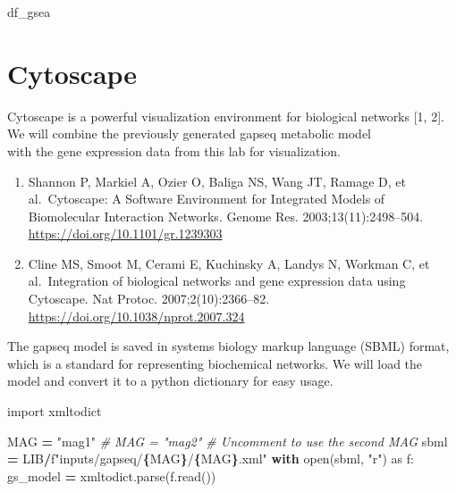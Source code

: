 \documentclass[
]{book}
\newenvironment{Shaded}{\begin{snugshade}}{\end{snugshade}}
\newcommand{\BuiltInTok}[1]{#1}
\newcommand{\CommentTok}[1]{\textcolor[rgb]{0.56,0.35,0.01}{\textit{#1}}}
\newcommand{\ControlFlowTok}[1]{\textcolor[rgb]{0.13,0.29,0.53}{\textbf{#1}}}
\newcommand{\ImportTok}[1]{#1}
\newcommand{\NormalTok}[1]{#1}
\newcommand{\OperatorTok}[1]{\textcolor[rgb]{0.81,0.36,0.00}{\textbf{#1}}}
\newcommand{\SpecialCharTok}[1]{\textcolor[rgb]{0.81,0.36,0.00}{\textbf{#1}}}
\newcommand{\SpecialStringTok}[1]{\textcolor[rgb]{0.31,0.60,0.02}{#1}}
\newcommand{\StringTok}[1]{\textcolor[rgb]{0.31,0.60,0.02}{#1}}
\providecommand{\tightlist}{%
  \setlength{\itemsep}{0pt}\setlength{\parskip}{0pt}}
\begin{document}
\begin{Shaded}
\begin{Highlighting}[numbers=left,,]
\NormalTok{df\_gsea}
\end{Highlighting}
\end{Shaded}

\section{Cytoscape}\label{cytoscape}

Cytoscape is a powerful visualization environment for biological networks {[}1, 2{]}. We will combine the previously generated gapseq metabolic model\\
with the gene expression data from this lab for visualization.

\begin{enumerate}
\def\labelenumi{\arabic{enumi}.}
\tightlist
\item
  Shannon P, Markiel A, Ozier O, Baliga NS, Wang JT, Ramage D, et al.~Cytoscape: A Software Environment for Integrated Models of Biomolecular Interaction Networks. Genome Res. 2003;13(11):2498--504. \url{https://doi.org/10.1101/gr.1239303}
\item
  Cline MS, Smoot M, Cerami E, Kuchinsky A, Landys N, Workman C, et al.~Integration of biological networks and gene expression data using Cytoscape. Nat Protoc. 2007;2(10):2366--82. \url{https://doi.org/10.1038/nprot.2007.324}
\end{enumerate}

The gapseq model is saved in systems biology markup language (SBML) format, which is a standard for representing biochemical networks.
We will load the model and convert it to a python dictionary for easy usage.

\begin{Shaded}
\begin{Highlighting}[numbers=left,,]
\ImportTok{import}\NormalTok{ xmltodict}

\NormalTok{MAG }\OperatorTok{=} \StringTok{"mag1"}
\CommentTok{\# MAG = "mag2"  \# Uncomment to use the second MAG}
\NormalTok{sbml }\OperatorTok{=}\NormalTok{ LIB}\OperatorTok{/}\SpecialStringTok{f"inputs/gapseq/}\SpecialCharTok{\{}\NormalTok{MAG}\SpecialCharTok{\}}\SpecialStringTok{/}\SpecialCharTok{\{}\NormalTok{MAG}\SpecialCharTok{\}}\SpecialStringTok{.xml"}
\ControlFlowTok{with} \BuiltInTok{open}\NormalTok{(sbml, }\StringTok{"r"}\NormalTok{) }\ImportTok{as}\NormalTok{ f:}
\NormalTok{    gs\_model }\OperatorTok{=}\NormalTok{ xmltodict.parse(f.read())}
\end{Highlighting}
\end{Shaded}
\end{document}
